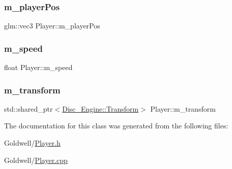 \mbox{\label{class_player_a3e452f529d00cfbb48cfd2d7b31bd3e7}} 
\subsubsection{\texorpdfstring{m\+\_\+player\+Pos}{m\_playerPos}}
{\footnotesize\ttfamily glm\+::vec3 Player\+::m\+\_\+player\+Pos\hspace{0.3cm}{\ttfamily [private]}}

\mbox{\label{class_player_ac872b310930295033b218f1551a27e34}} 
\subsubsection{\texorpdfstring{m\+\_\+speed}{m\_speed}}
{\footnotesize\ttfamily float Player\+::m\+\_\+speed\hspace{0.3cm}{\ttfamily [private]}}

\mbox{\label{class_player_a142e036a5be744cf38af08b56f1bf17b}} 
\subsubsection{\texorpdfstring{m\+\_\+transform}{m\_transform}}
{\footnotesize\ttfamily std\+::shared\+\_\+ptr$<$\mbox{\hyperlink{class_disc___engine_1_1_transform}{Disc\+\_\+\+Engine\+::\+Transform}}$>$ Player\+::m\+\_\+transform\hspace{0.3cm}{\ttfamily [private]}}



The documentation for this class was generated from the following files\+:\begin{DoxyCompactItemize}
\item 
Goldwell/\mbox{\hyperlink{_player_8h}{Player.\+h}}\item 
Goldwell/\mbox{\hyperlink{_player_8cpp}{Player.\+cpp}}\end{DoxyCompactItemize}
